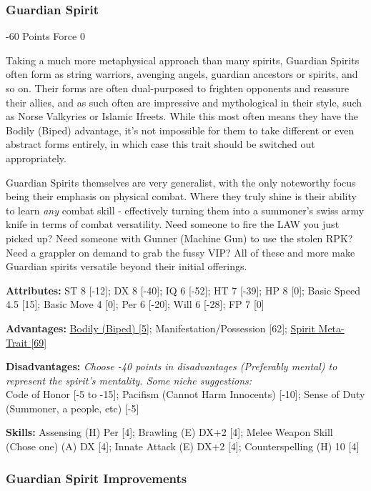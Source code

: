 \begin{multicols}{3}
	\subsubsection{Guardian Spirit}
	\begin{flushright}
		-60 Points Force 0
	\end{flushright}
	
	Taking a much more metaphysical approach than many spirits, Guardian Spirits often form as string warriors, avenging angels, guardian ancestors or spirits, and so on. Their forms are often dual-purposed to frighten opponents and reassure their allies, and as such often are impressive and mythological in their style, such as Norse Valkyries or Islamic Ifreets. While this most often means they have the Bodily (Biped) advantage, it's not impossible for them to take different or even abstract forms entirely, in which case this trait should be switched out appropriately.	
	
	Guardian Spirits themselves are very generalist, with the only noteworthy focus being their emphasis on physical combat. Where they truly shine is their ability to learn \textit{any} combat skill - effectively turning them into a summoner's swiss army knife in terms of combat versatility. Need someone to fire the LAW you just picked up? Need someone with Gunner (Machine Gun) to use the stolen RPK? Need a grappler on demand to grab the fussy VIP? All of these and more make Guardian spirits versatile beyond their initial offerings.
	
	\textbf{Attributes:}
	ST 8 [-12]; DX 8 [-40]; IQ 6 [-52]; HT 7 [-39]; HP 8 [0]; Basic Speed 4.5 [15]; Basic Move 4 [0]; Per 6 [-20]; Will 6 [-28]; FP 7 [0]
	
	\textbf{Advantages:}
	\hyperref[bodily]{Bodily (Biped) [5]}; Manifestation/Possession [62]; \hyperref[spirit_meta_trait]{Spirit Meta-Trait [69]}
	
	\textbf{Disadvantages:}
	\textit{Choose -40 points in disadvantages (Preferably mental) to represent the spirit's mentality. Some niche suggestions:\\}
	Code of Honor [-5 to -15]; Pacifism (Cannot Harm Innocents) [-10]; Sense of Duty (Summoner, a people, etc) [-5]
	
	\textbf{Skills:}
	Assensing (H) Per [4]; Brawling (E) DX+2 [4]; Melee Weapon Skill (Chose one) (A) DX [4]; Innate Attack (E) DX+2 [4]; Counterspelling (H) 10 [4]
	
	\subsubsection*{Guardian Spirit Improvements}
	

\end{multicols}
